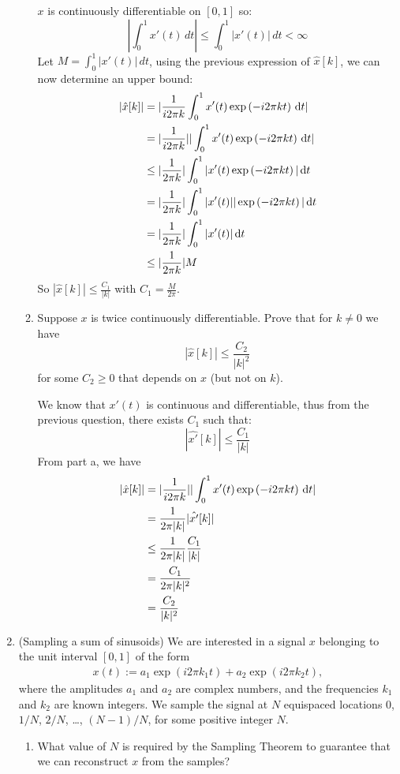 \documentclass[12pt,twoside]{article}
\begin{document}
\begin{enumerate}
\begin{enumerate}
    $x$ is continuously differentiable on $[0,1]$ so:
     $$\left|\int_0^1 x'(t)\,dt\right| \leq \int_0^1 |x'(t)|\,dt<\infty$$
     Let  $M=\int_0^1 |x'(t)|\,dt$, using the previous expression of $\hat{x}[k] $, we can now determine an upper bound:
     \begin{align*}
	   | \hat{x}[k]| 	&= |\frac{1}{i 2 \pi k} \int_0^1 x'(t) \exp \left( - i2 \pi k t \right)  \, \text{d}t| \\
	   			&= |\frac{1}{i 2 \pi k}| | \int_0^1 x'(t) \exp \left( - i2 \pi k t \right)  \, \text{d}t | \\
				&\le |\frac{1}{2 \pi k}|  \int_0^1 | x'(t) \exp \left( - i2 \pi k t \right)| \, \text{d}t  \\
				&= |\frac{1}{2 \pi k}|  \int_0^1 | x'(t)  |  |\exp \left( - i2 \pi k t \right)| \, \text{d}t  \\
				&=  |\frac{1}{2 \pi k}|  \int_0^1 | x'(t) |  \, \text{d}t  \\
				&\le  |\frac{1}{2 \pi k}| M\\
     \end{align*}
     So  $| \hat{x}[k]| \leq \frac{C_1}{|k|}$ with $C_1 = \frac{M}{2 \pi}$.
	         
  \item Suppose $x$ is twice continuously differentiable.
    Prove that for $k\neq 0$ we have
    $$|\hat{x}[k]| \leq \frac{C_2}{|k|^2}$$
    for some $C_2\geq0$ that depends on $x$ (but not on $k$).
    
    We know that $x'(t)$ is continuous and differentiable, thus from the previous question, there exists $C_1$ such that:
    $$ | \hat{x'}[k]|  \leq \frac{C_1}{|k|}$$
    From part a, we have
    \begin{align*}
    	 | \hat{x}[k]| 	&= |\frac{1}{i 2 \pi k}| | \int_0^1 x'(t) \exp \left( - i2 \pi k t \right)  \, \text{d}t | \\
	 			&= \frac{1}{2 \pi |k|}  | \hat{x'}[k]| \\
				&\le \frac{1}{2 \pi |k|}  \frac{C_1}{|k|} \\
				&= \frac{C_1}{2 \pi |k|^2} \\ 
				&=  \frac{C_2}{|k|^2}
    \end{align*}
          
   \end{enumerate}
  
\newpage

\item (Sampling a sum of sinusoids) We are interested in a signal $x$ belonging to the unit interval $[0,1]$ of the form
\begin{align}
x(t) := a_1 \exp (i 2 \pi k_1 t ) + a_2 \exp (i 2 \pi k_2 t ),
\end{align}
where the amplitudes $a_1$ and $a_2$ are complex numbers, and the
frequencies $k_1$ and $k_2$ are known integers.
We sample the signal at $N$ equispaced locations $0$, $1/N$, $2/N$,
\ldots, $(N-1)/N$, for some positive integer $N$.  
\begin{enumerate}
\item What value of $N$ is required by the Sampling Theorem to
  guarantee that we can reconstruct $x$ from the samples? \\
  

\end{enumerate}
\end{enumerate}
\end{document}
